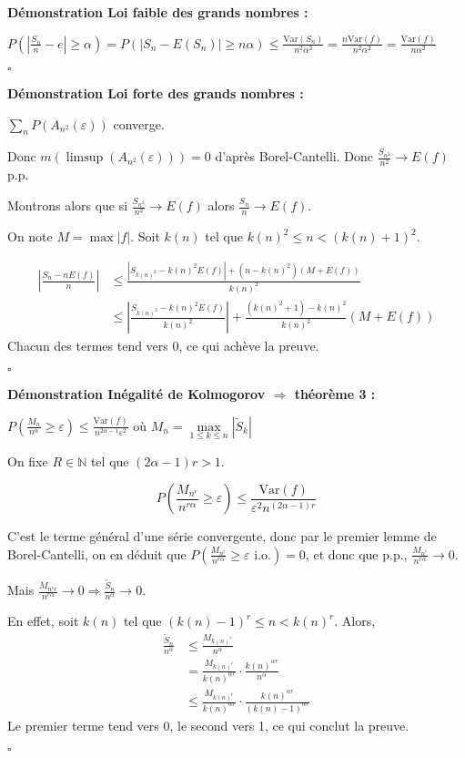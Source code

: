\documentclass[10pt,a4paper,notitlepage ]{report}
\newcommand{\N}{\mathbb N}
\newcommand{\eps}{\varepsilon}
\newcommand{\var}{\mathrm{Var}}
\newcounter{th}
\newenvironment{demo}[1][]{

	\textbf{Démonstration #1 :}
}{\begin{flushright}
	$\square$
\end{flushright}
}
\begin{document}
\begin{demo}[Loi faible des grands nombres]
	
	$P(\left|\frac {S_n} n - e \right| \ge \alpha) = P(|S_n - E(S_n)| \ge n\alpha) \le \frac{\var(S_n)}{n^2\alpha^2} = \frac{n \var(f)}{n^2\alpha^2} = \frac{\var(f)}{n\alpha^2}$
\end{demo}

\begin{demo}[Loi forte des grands nombres]
	$\sum_n P(A_{n^2}(\eps))$ converge.
	
	Donc $m(\limsup(A_{n^2}(\eps)))= 0$ d'après Borel-Cantelli. Donc $\frac {S_{n^2}} {n^2} \rightarrow E(f)$ p.p.
	
	Montrons alors que si $\frac {S_{n^2}} {n^2} \rightarrow E(f)$ alors $\frac {S_n} n \rightarrow E(f)$.
	
	On note $M = \max |f|$. Soit $k(n)$ tel que $k(n)^2 \le n < (k(n) + 1)^2$.
	
	\begin{align*}
		\left| \frac{S_n - nE(f)} n \right| &\le \frac{|S_{k(n)^2} - k(n)^2E(f)| + (n-k(n)^2)(M+E(f))}{k(n)^2} \\
		&\le \left| \frac {S_{k(n)^2} - k(n)^2E(f)}{k(n)^2} \right| + \frac{(k(n)^2 +1) - k(n)^2}{k(n)^2} (M + E(f))
	\end{align*}
	Chacun des termes tend vers $0$, ce qui achève la preuve.
\end{demo}

\begin{demo}[Inégalité de Kolmogorov $\Rightarrow$ théorème 3]
	
	$P(\frac{M_n}{n^\alpha} \ge \eps) \le \frac{\var(f)}{n^{2\alpha -1}\eps^2}$ où $M_n = \underset{1\le k \le n}\max |\tilde S_k|$
	
	On fixe $R\in\N$ tel que $(2\alpha -1)r > 1$.
	
	\[P(\frac{M_{n^r}}{n^{r\alpha}} \ge \eps) \le \frac{\var(f)}{\eps^2 n^{(2\alpha - 1)r}}\]
	
	C'est le terme général d'une série convergente, donc par le premier lemme de Borel-Cantelli, on en déduit que $P(\frac{M_{n^r}}{n^{r\alpha}} \ge \eps \text{ i.o.}) = 0$, et donc que p.p., $\frac{M_{n^r}}{n^{r\alpha}} \rightarrow 0$.
	
	Mais $\frac{M_{n^rr}}{n^{r\alpha}} \rightarrow 0 \Rightarrow \frac{\tilde S_n}{n^\alpha} \rightarrow 0$.
	
	En effet, soit $k(n)$ tel que $(k(n) -1)^r \le n < k(n)^r$. Alors,
	\begin{align*}
		\frac{\tilde S_n}{n^\alpha} &\le \frac{M_{k(n)^r}}{n^\alpha} \\
		& = \frac{M_{k(n)^r}}{k(n)^{\alpha r}} \cdot \frac{k(n)^{\alpha r}}{n^\alpha} \\
		&\le \frac{M_{k(n)^r}}{k(n)^{\alpha r}} \cdot \frac{k(n)^{\alpha r}}{(k(n) -1)^{\alpha r}}
	\end{align*}
	Le premier terme tend vers 0, le second vers 1, ce qui conclut la preuve.
\end{demo}
\end{document}
